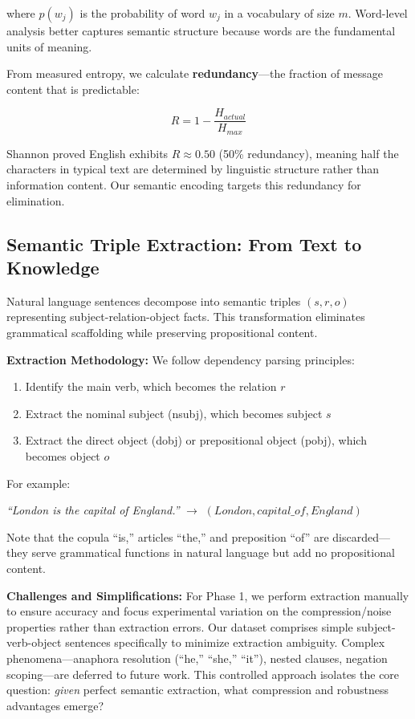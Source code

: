 \documentclass[conference]{IEEEtran}
\begin{document}
where $p(w_j)$ is the probability of word $w_j$ in a vocabulary of size 
$m$. Word-level analysis better captures semantic structure because 
words are the fundamental units of meaning.

From measured entropy, we calculate \textbf{redundancy}—the fraction 
of message content that is predictable:

\begin{equation}
R = 1 - \frac{H_{actual}}{H_{max}}
\label{eq:redundancy}
\end{equation}

Shannon proved English exhibits $R \approx 0.50$ (50\% redundancy), meaning 
half the characters in typical text are determined by linguistic structure 
rather than information content. Our semantic encoding targets this 
redundancy for elimination.

\subsection{Semantic Triple Extraction: From Text to Knowledge}

Natural language sentences decompose into semantic triples $(s, r, o)$ 
representing subject-relation-object facts. This transformation eliminates 
grammatical scaffolding while preserving propositional content.

\textbf{Extraction Methodology:} We follow dependency parsing principles:

\begin{enumerate}
\item Identify the main verb, which becomes the relation $r$
\item Extract the nominal subject (nsubj), which becomes subject $s$
\item Extract the direct object (dobj) or prepositional object (pobj), 
      which becomes object $o$
\end{enumerate}

For example:

\textit{``London is the capital of England.''} $\rightarrow$ 
$(London, capital\_of, England)$

Note that the copula ``is,'' articles ``the,'' and preposition ``of'' 
are discarded—they serve grammatical functions in natural language but 
add no propositional content.

\textbf{Challenges and Simplifications:} For Phase 1, we perform extraction 
manually to ensure accuracy and focus experimental variation on the 
compression/noise properties rather than extraction errors. Our dataset 
comprises simple subject-verb-object sentences specifically to minimize 
extraction ambiguity. Complex phenomena—anaphora resolution (``he,'' 
``she,'' ``it''), nested clauses, negation scoping—are deferred to future 
work. This controlled approach isolates the core question: \textit{given} 
perfect semantic extraction, what compression and robustness advantages 
emerge?
\end{document}
